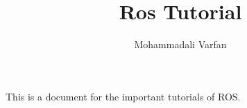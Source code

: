\documentclass[•]{article}
\title{Ros Tutorial}
\author{Mohammadali Varfan}
\begin{document}
This is a document for the important tutorials of ROS.
\end{document}
